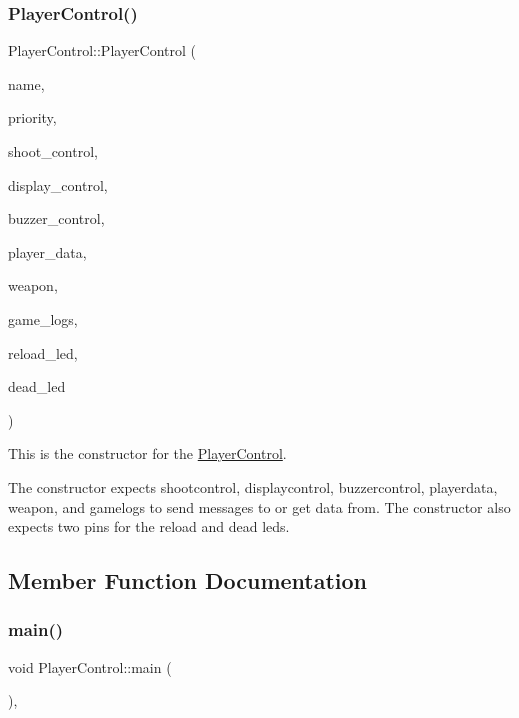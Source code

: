 \subsubsection{\texorpdfstring{Player\+Control()}{PlayerControl()}}
{\footnotesize\ttfamily Player\+Control\+::\+Player\+Control (\begin{DoxyParamCaption}\item[{const char $\ast$}]{name,  }\item[{int}]{priority,  }\item[{\mbox{\hyperlink{class_shoot_control}{Shoot\+Control}} \&}]{shoot\+\_\+control,  }\item[{\mbox{\hyperlink{class_display_control}{Display\+Control}} \&}]{display\+\_\+control,  }\item[{\mbox{\hyperlink{class_buzzer_control}{Buzzer\+Control}} \&}]{buzzer\+\_\+control,  }\item[{\mbox{\hyperlink{class_player_data}{Player\+Data}} \&}]{player\+\_\+data,  }\item[{\mbox{\hyperlink{class_weapon}{Weapon}} \&}]{weapon,  }\item[{\mbox{\hyperlink{class_game_logs}{Game\+Logs}} \&}]{game\+\_\+logs,  }\item[{auto \&}]{reload\+\_\+led,  }\item[{auto \&}]{dead\+\_\+led }\end{DoxyParamCaption})\hspace{0.3cm}{\ttfamily [inline]}}



This is the constructor for the \mbox{\hyperlink{class_player_control}{Player\+Control}}. 

The constructor expects shootcontrol, displaycontrol, buzzercontrol, playerdata, weapon, and gamelogs to send messages to or get data from. The constructor also expects two pins for the reload and dead leds. 

\subsection{Member Function Documentation}
\mbox{\label{class_player_control_a9b3e136e412776977a658b232e7e9d6e}} 
\subsubsection{\texorpdfstring{main()}{main()}}
{\footnotesize\ttfamily void Player\+Control\+::main (\begin{DoxyParamCaption}{ }\end{DoxyParamCaption})\hspace{0.3cm}{\ttfamily [inline]}, {\ttfamily [override]}}



